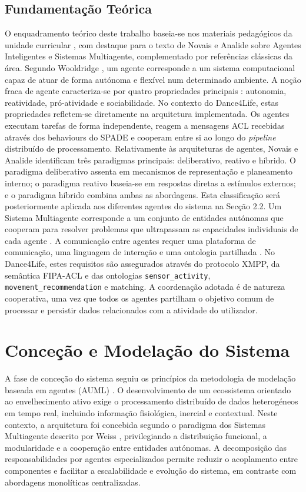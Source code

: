 \documentclass[runningheads]{llncs}
\begin{document}
\subsection{Fundamentação Teórica}
O enquadramento teórico deste trabalho baseia-se nos materiais pedagógicos da unidade curricular \cite{asmagentes,asmsma,asmnormas,agentesinteligentes}, com destaque para o texto de Novais e Analide \cite{agentesinteligentes} sobre Agentes Inteligentes e Sistemas Multiagente, complementado por referências clássicas da área. 
Segundo Wooldridge \cite{wooldridge1999}, um agente corresponde a um sistema computacional capaz de atuar de forma autónoma e flexível num determinado ambiente. A noção fraca de agente caracteriza-se por quatro propriedades principais \cite{wooldridgejennings1995}: autonomia, reatividade, pró-atividade e sociabilidade. No contexto do Dance4Life, estas propriedades refletem-se diretamente na arquitetura implementada. Os agentes executam tarefas de forma independente, reagem a mensagens ACL recebidas através dos behaviours do SPADE e cooperam entre si ao longo do \textit{pipeline} distribuído de processamento. 
Relativamente às arquiteturas de agentes, Novais e Analide \cite{agentesinteligentes} identificam três paradigmas principais: deliberativo, reativo e híbrido. O paradigma deliberativo assenta em mecanismos de representação e planeamento interno; o paradigma reativo baseia-se em respostas diretas a estímulos externos; e o paradigma híbrido combina ambas as abordagens. Esta classificação será posteriormente aplicada aos diferentes agentes do sistema na Secção 2.2. 
Um Sistema Multiagente corresponde a um conjunto de entidades autónomas que cooperam para resolver problemas que ultrapassam as capacidades individuais de cada agente \cite{weiss1999,durfeerosenchien1994}. A comunicação entre agentes requer uma plataforma de comunicação, uma linguagem de interação e uma ontologia partilhada \cite{agentesinteligentes}. No Dance4Life, estes requisitos são assegurados através do protocolo XMPP, da semântica FIPA-ACL e das ontologias \texttt{sensor\_activity}, \texttt{movement\_recommendation} e matching. A coordenação adotada é de natureza cooperativa, uma vez que todos os agentes partilham o objetivo comum de processar e persistir dados relacionados com a atividade do utilizador. 

\section{Conceção e Modelação do Sistema}
A fase de conceção do sistema seguiu os princípios da metodologia de modelação baseada em agentes (AUML) \cite{agentesinteligentes}. O desenvolvimento de um ecossistema orientado ao envelhecimento ativo exige o processamento distribuído de dados heterogéneos em tempo real, incluindo informação fisiológica, inercial e contextual. 
Neste contexto, a arquitetura foi concebida segundo o paradigma dos Sistemas Multiagente descrito por Weiss \cite{weiss1999}, privilegiando a distribuição funcional, a modularidade e a cooperação entre entidades autónomas. A decomposição das responsabilidades por agentes especializados permite reduzir o acoplamento entre componentes e facilitar a escalabilidade e evolução do sistema, em contraste com abordagens monolíticas centralizadas. 
\end{document}
